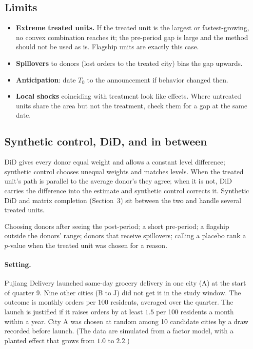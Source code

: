 \documentclass[11pt]{article}
\begin{document}
\subsection{Limits}

\begin{itemize}
  \item \textbf{Extreme treated units.} If the treated unit is the largest or fastest-growing, no convex combination reaches it; the pre-period gap is
  large and the method should not be used as is. Flagship units are exactly this case.
  \item \textbf{Spillovers} to donors (lost orders to the treated city) bias the gap upwards.
  \item \textbf{Anticipation}: date $T_0$ to the announcement if behavior changed then.
  \item \textbf{Local shocks} coinciding with treatment look like effects. Where untreated units share the area but not the treatment, check them
  for a gap at the same date.
\end{itemize}

\subsection{Synthetic control, DiD, and in between}

DiD gives every donor equal weight and allows a constant level difference; synthetic control chooses unequal weights and matches levels. When
the treated unit's path is parallel to the average donor's they agree; when it is not, DiD carries the difference into the estimate and synthetic
control corrects it. Synthetic DiD and matrix completion (Section~3) sit between the two and handle several treated units.

\begin{pitfall}
Choosing donors after seeing the post-period; a short pre-period; a flagship outside the donors' range; donors that receive spillovers; calling a
placebo rank a $p$-value when the treated unit was chosen for a reason.
\end{pitfall}

\sectiontwo

\paragraph{Setting.} Pujiang Delivery launched same-day grocery delivery in one city (A) at the start of quarter 9. Nine other cities (B to J) did not get it in
the study window. The outcome is monthly orders per 100 residents, averaged over the quarter. The launch is justified if it raises orders by at least
$1.5$ per 100 residents a month within a year. City A was chosen at random among 10 candidate cities by a draw recorded before launch. (The data are
simulated from a factor model, with a planted effect that grows from $1.0$ to $2.2$.)
\end{document}
